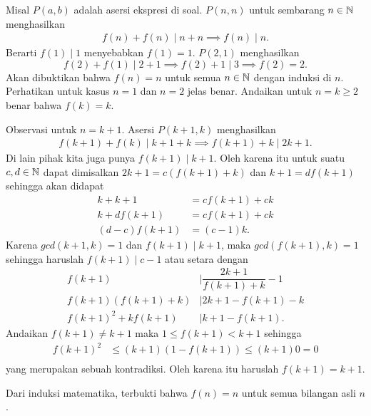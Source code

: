 
\begin{solusi}
    Misal $P(a,b)$ adalah asersi ekspresi di soal. $P(n,n)$ untuk sembarang $n \in \mathbb N$ menghasilkan
    \begin{align*}
        f(n)+f(n) \mid n+n \implies f(n) \mid n.
    \end{align*}
    Berarti $f(1) \mid 1$ menyebabkan $f(1)=1$. $P(2,1)$ menghasilkan  
    $$f(2)+f(1) \mid 2+1 \implies f(2)+1 \mid 3 \implies f(2)=2.$$ Akan dibuktikan bahwa $f(n)=n$ untuk semua $n \in \mathbb N$ dengan induksi di $n$.
    Perhatikan untuk kasus $n=1$ dan $n=2$ jelas benar. Andaikan untuk $n=k\ge 2$ benar bahwa $f(k)=k$. 
    
    Observasi untuk $n=k+1$. Asersi $P(k+1,k)$ menghasilkan
    \begin{align*}
        f(k+1)+f(k) \mid k+1 + k \implies f(k+1)+k \mid 2k+1.
    \end{align*}
    Di lain pihak kita juga punya $f(k+1) \mid k+1$. Oleh karena itu untuk suatu $c,d \in \mathbb N$ dapat dimisalkan $2k+1 = c(f(k+1)+k)$ dan $ k+1 = df(k+1) $
    sehingga akan didapat
    \begin{align*}
        k + k+1 &= cf(k+1)+ck\\
        k + df(k+1) &= cf(k+1) + ck\\
        (d-c)f(k+1) &= (c-1)k.
    \end{align*}
    Karena $gcd(k+1,k) =1$ dan $f(k+1) \mid k+1$, maka $gcd(f(k+1),k)=1$ sehingga haruslah $f(k+1) \mid c-1$ atau setara dengan
    \begin{align*}
        f(k+1) &\mid \dfrac{2k+1}{f(k+1)+k} - 1\\
        f(k+1)(f(k+1)+k) &\mid 2k+1 - f(k+1) - k\\
        f(k+1)^2+kf(k+1) &\mid k+1 - f(k+1).
    \end{align*}
    Andaikan $f(k+1) \neq k+1$ maka $1 \le f(k+1) < k+1$ sehingga
    \begin{align*}
        f(k+1)^2 &\le (k+1)(1-f(k+1)) \le (k+1)0 = 0\\
    \end{align*}
    yang merupakan sebuah kontradiksi. Oleh karena itu haruslah $f(k+1)=k+1$.

    Dari induksi matematika, terbukti bahwa $f(n)=n$ untuk semua bilangan asli $n$.
\end{solusi}